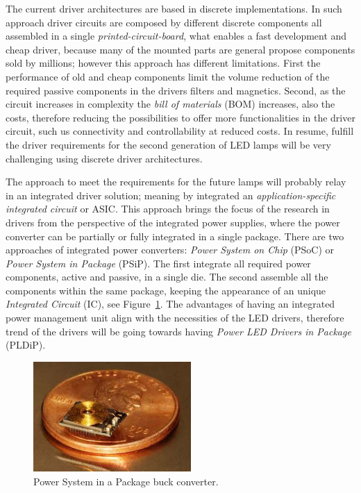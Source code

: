 The current driver architectures are based in discrete implementations. In such approach driver circuits are composed by different discrete components all assembled in a single \emph{printed-circuit-board}, what enables a fast development and cheap driver, because many of the mounted parts are general propose components sold by millions; however this approach has different limitations. First the performance of old and cheap components limit the volume reduction of the required  passive components in the drivers filters and magnetics. Second, as the circuit increases in complexity the \emph{bill of materials} (BOM) increases, also the costs, therefore reducing the possibilities to offer more functionalities in the driver circuit, such us connectivity and controllability at reduced costs. In resume, fulfill the driver requirements for the second generation of LED lamps will be very challenging using  discrete driver  architectures.

The approach to meet the requirements for the future lamps will probably relay in an integrated driver solution; meaning by integrated an \emph{application-specific integrated circuit} or ASIC. This approach brings the focus of the research in drivers  from the perspective of the integrated power supplies, where the power converter can be partially or fully integrated in a single package. There are two approaches of integrated power converters: \emph{Power System on Chip} (PSoC) or  \emph{Power System in Package} (PSiP). The first integrate all required power components, active and passive, in a single die. The second assemble all the components within the same package, keeping the appearance of an unique \emph{Integrated Circuit} (IC), see Figure~\ref{fig:psoc_example}. The advantages of having an integrated power management unit align with the necessities of the LED drivers, therefore trend of the drivers will be going towards having \emph{Power LED Drivers in Package} (PLDiP).

\begin{figure}[!h]
    \centering
    \includegraphics[width=6cm]{./0_intro/img/FSolzbacher01.jpg}
    \caption{Power System in a Package buck converter.}
    \label{fig:psoc_example}
\end{figure}


